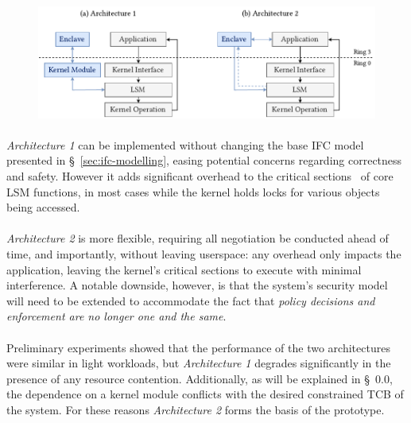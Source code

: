 \begin{figure}[]
    \centering
    \includegraphics[width=0.98\linewidth]{figures/SGX-EnclaveIntegration-Design}
    \caption{}
    \vspace{2mm}
    \label{fig:sgx-integration}
    \vspace{5mm}
\end{figure}

\paragraph{}\textit{Architecture 1} can be implemented without changing the base IFC model presented in §~\ref{sec:ifc-modelling}, easing potential concerns regarding correctness and safety. However it adds significant overhead to the critical sections~\cite{Dubois1988SynchronizationCA} of core LSM functions, in most cases while the kernel holds locks for various objects being accessed.

\paragraph{} \textit{Architecture 2} is more flexible, requiring all negotiation be conducted ahead of time, and importantly, without leaving userspace: any overhead only impacts the application, leaving the kernel's critical sections to execute with minimal interference. A notable downside, however, is that the system's security model will need to be extended to accommodate the fact that \textit{policy decisions and enforcement are no longer one and the same}.

\paragraph{} Preliminary experiments showed that the performance of the two architectures were similar in light workloads, but \textit{Architecture 1} degrades significantly in the presence of any resource contention. Additionally, as will be explained in §~0.0, the dependence on a kernel module conflicts with the desired constrained TCB of the system. For these reasons \textit{Architecture 2} forms the basis of the prototype.

